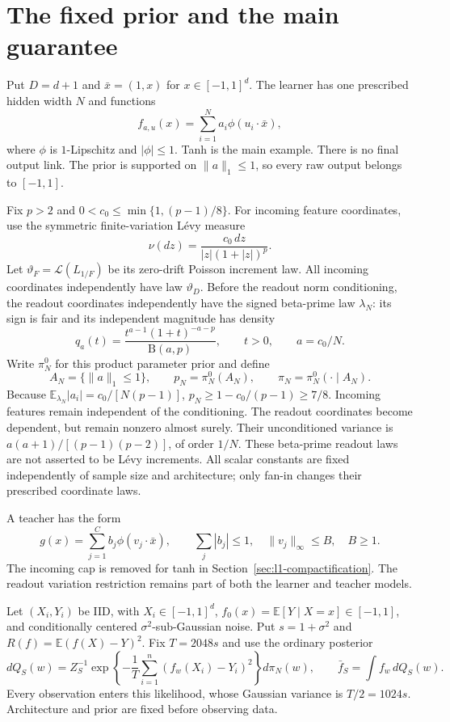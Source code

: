 \section{The fixed prior and the main guarantee}
\label{sec:sharp-model}
Put $D=d+1$ and $\bar x=(1,x)$ for $x\in[-1,1]^d$. The learner has one
prescribed hidden width $N$ and functions
\[
 f_{a,u}(x)=\sum_{i=1}^N a_i\phi(u_i\cdot\bar x),
\]
where $\phi$ is $1$-Lipschitz and $|\phi|\le1$. Tanh is the main example.
There is no final output link. The prior is supported on $\|a\|_1\le1$,
so every raw output belongs to $[-1,1]$.

Fix $p>2$ and $0<c_0\le\min\{1,(p-1)/8\}$. For incoming feature
coordinates, use the symmetric finite-variation L\'evy measure
\[
 \nu(dz)=\frac{c_0\,dz}{|z|(1+|z|)^p}.
\]
Let $\vartheta_F=\mathcal L(L_{1/F})$ be its zero-drift Poisson
increment law. All incoming coordinates independently have law
$\vartheta_D$. Before the readout norm conditioning, the readout
coordinates independently have the signed beta-prime law $\lambda_N$:
its sign is fair and its independent magnitude has density
\[
 q_a(t)=\frac{t^{a-1}(1+t)^{-a-p}}{\mathrm B(a,p)},\qquad
 t>0,\qquad a=c_0/N.
\]
Write $\pi_N^0$ for this product parameter prior and define
\[
 A_N=\{\|a\|_1\le1\},\qquad p_N=\pi_N^0(A_N),\qquad
 \pi_N=\pi_N^0(\cdot\mid A_N).
\]
Because $\mathbb E_{\lambda_N}|a_i|=c_0/[N(p-1)]$,
$p_N\ge1-c_0/(p-1)\ge7/8$. Incoming features remain independent of the
conditioning. The readout coordinates become dependent, but remain
nonzero almost surely. Their unconditioned variance is
$a(a+1)/[(p-1)(p-2)]$, of order $1/N$. These beta-prime readout laws
are not asserted to be L\'evy increments. All scalar constants are
fixed independently of sample size and architecture; only fan-in
changes their prescribed coordinate laws.

A teacher has the form
\[
 g(x)=\sum_{j=1}^C b_j\phi(v_j\cdot\bar x),\qquad
 \sum_j|b_j|\le1,\quad \|v_j\|_\infty\le B,\quad B\ge1.
\]
The incoming cap is removed for tanh in
Section~\ref{sec:l1-compactification}. The readout variation restriction
remains part of both the learner and teacher models.

Let $(X_i,Y_i)$ be IID, with $X_i\in[-1,1]^d$,
$f_0(x)=\mathbb E[Y\mid X=x]\in[-1,1]$, and conditionally centered
$\sigma^2$-sub-Gaussian noise. Put $s=1+\sigma^2$ and
$R(f)=\mathbb E(f(X)-Y)^2$. Fix $T=2048s$ and use the ordinary posterior
\[
 dQ_S(w)=Z_S^{-1}\exp\left\{-\frac1T
                  \sum_{i=1}^n(f_w(X_i)-Y_i)^2\right\}d\pi_N(w),
 \qquad \bar f_S=\int f_w\,dQ_S(w).
\]
Every observation enters this likelihood, whose Gaussian variance is
$T/2=1024s$. Architecture and prior are fixed before observing data.

